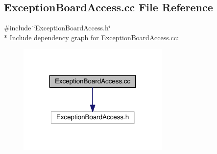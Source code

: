 \hypertarget{a00003}{}\subsection{Exception\+Board\+Access.\+cc File Reference}
\label{a00003}
{\ttfamily \#include \char`\"{}Exception\+Board\+Access.\+h\char`\"{}}\\*
Include dependency graph for Exception\+Board\+Access.\+cc\+:
\nopagebreak
\begin{figure}[H]
\begin{center}
\leavevmode
\includegraphics[width=212pt]{a00013}
\end{center}
\end{figure}
